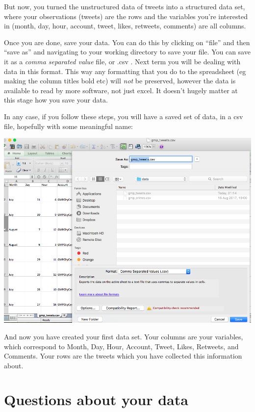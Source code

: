 \documentclass[
]{book}
\begin{document}
But now, you turned the unstructured data of tweets into a structured data set, where your observations (tweets) are the rows and the variables you're interested in (month, day, hour, account, tweet, likes, retweets, comments) are all columns.

Once you are done, save your data. You can do this by clicking on ``file'' and then ``save as'' and navigating to your working directory to save your file. You can save it as a \emph{comma separated value} file, or .csv . Next term you will be dealing with data in this format. This way any formatting that you do to the spreadsheet (eg making the column titles bold etc) will \emph{not} be preserved, however the data is available to read by more software, not just excel. It doesn't hugely matter at this stage how you save your data.

In any case, if you follow these steps, you will have a saved set of data, in a csv file, hopefully with some meaningful name:

\includegraphics{imgs/save_tweets.png}

And now you have created your first data set. Your columns are your variables, which correspond to Month, Day, Hour, Account, Tweet, Likes, Retweets, and Comments. Your rows are the tweets which you have collected this information about.

\hypertarget{questions-about-your-data}{%
\section{Questions about your data}\label{questions-about-your-data}}
\end{document}
